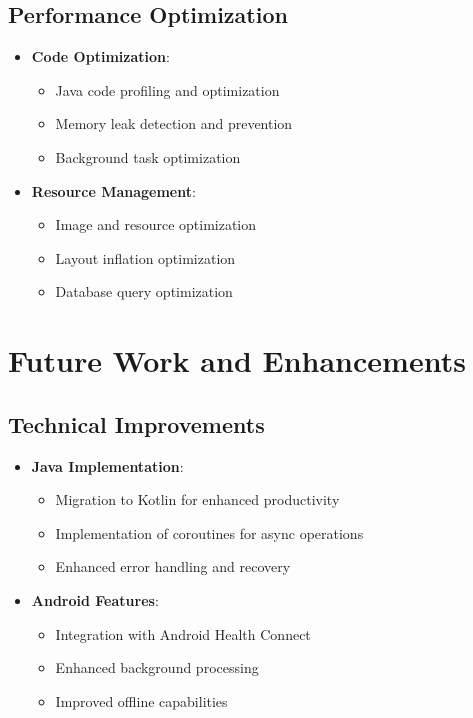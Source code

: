 \section{Performance Optimization}
\begin{itemize}
    \item \textbf{Code Optimization}:
    \begin{itemize}
        \item Java code profiling and optimization
        \item Memory leak detection and prevention
        \item Background task optimization
    \end{itemize}
    
    \item \textbf{Resource Management}:
    \begin{itemize}
        \item Image and resource optimization
        \item Layout inflation optimization
        \item Database query optimization
    \end{itemize}
\end{itemize}

\chapter{Future Work and Enhancements}
\section{Technical Improvements}
\begin{itemize}
    \item \textbf{Java Implementation}:
    \begin{itemize}
        \item Migration to Kotlin for enhanced productivity
        \item Implementation of coroutines for async operations
        \item Enhanced error handling and recovery
    \end{itemize}
    
    \item \textbf{Android Features}:
    \begin{itemize}
        \item Integration with Android Health Connect
        \item Enhanced background processing
        \item Improved offline capabilities
    \end{itemize}
\end{itemize}

